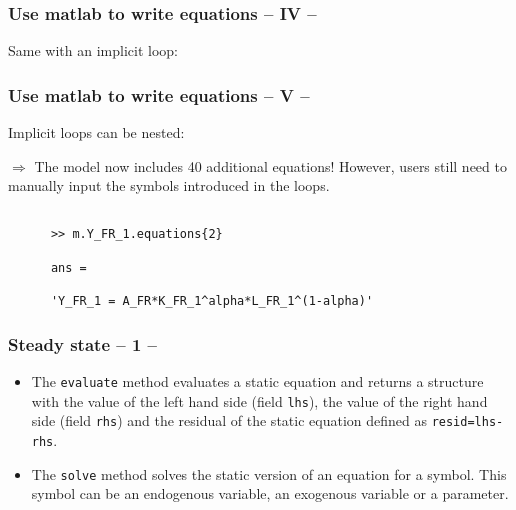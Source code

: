 \documentclass[10pt,slidestop]{beamer}
\theoremstyle{plain}
\begin{document}
\begin{frame}[c,fragile]
  \frametitle{Use matlab to write equations -- IV --}

  Same with an implicit loop:

  \bigskip

  

\end{frame}


\begin{frame}[c,fragile]
  \frametitle{Use matlab to write equations -- V --}

  Implicit loops can be nested:

  \bigskip

  

  $\Rightarrow$ The model now includes 40 additional equations! However, users still need to manually input the symbols introduced in the loops.\newline

  \begin{lstlisting}[style=MatlabConsole]

      >> m.Y_FR_1.equations{2}

      ans =

      'Y_FR_1 = A_FR*K_FR_1^alpha*L_FR_1^(1-alpha)'
  \end{lstlisting}

\end{frame}


\begin{frame}[c,fragile]
  \frametitle{Steady state -- 1 --}

  \begin{itemize}

  \item The \verb+evaluate+ method evaluates a static equation and
    returns a structure with the value of the left hand side (field
    \verb+lhs+), the value of the right hand side (field \verb+rhs+)
    and the residual of the static equation defined as
    \verb+resid=lhs-rhs+.\newline

    \medskip

  \item The \verb+solve+ method solves the static version of an
    equation for a symbol. This symbol can be an endogenous variable,
    an exogenous variable or a parameter.\newline

  \end{itemize}

\end{frame}
\end{document}
